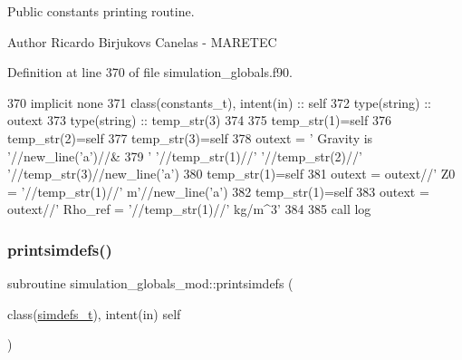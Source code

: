 Public constants printing routine. 

\begin{DoxyAuthor}{Author}
Ricardo Birjukovs Canelas -\/ M\+A\+R\+E\+T\+EC 
\end{DoxyAuthor}


Definition at line 370 of file simulation\+\_\+globals.\+f90.


\begin{DoxyCode}
370     \textcolor{keywordtype}{implicit none}
371     \textcolor{keywordtype}{class}(constants\_t), \textcolor{keywordtype}{intent(in)} :: self
372     \textcolor{keywordtype}{type}(string) :: outext
373     \textcolor{keywordtype}{type}(string) :: temp\_str(3)
374 
375     temp\_str(1)=self%
376     temp\_str(2)=self%
377     temp\_str(3)=self%
378     outext = \textcolor{stringliteral}{'      Gravity is '}//new\_line(\textcolor{stringliteral}{'a'})//&
379         \textcolor{stringliteral}{'       '}//temp\_str(1)//\textcolor{stringliteral}{' '}//temp\_str(2)//\textcolor{stringliteral}{' '}//temp\_str(3)//new\_line(\textcolor{stringliteral}{'a'})
380     temp\_str(1)=self%
381     outext = outext//\textcolor{stringliteral}{'       Z0 = '}//temp\_str(1)//\textcolor{stringliteral}{' m'}//new\_line(\textcolor{stringliteral}{'a'})
382     temp\_str(1)=self%
383     outext = outext//\textcolor{stringliteral}{'       Rho\_ref = '}//temp\_str(1)//\textcolor{stringliteral}{' kg/m^3'}
384 
385     \textcolor{keyword}{call }log%
\end{DoxyCode}
\mbox{\label{namespacesimulation__globals__mod_ad331ccf019de7ed531e37c655600f90f}} 
\subsubsection{\texorpdfstring{printsimdefs()}{printsimdefs()}}
{\footnotesize\ttfamily subroutine simulation\+\_\+globals\+\_\+mod\+::printsimdefs (\begin{DoxyParamCaption}\item[{class(\mbox{\hyperlink{structsimulation__globals__mod_1_1simdefs__t}{simdefs\+\_\+t}}), intent(in)}]{self }\end{DoxyParamCaption})\hspace{0.3cm}{\ttfamily [private]}}



